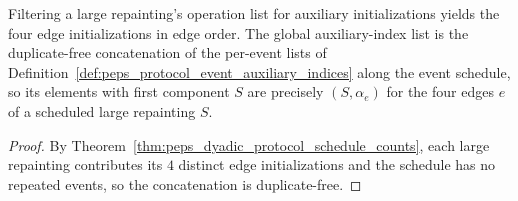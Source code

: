 \begin{lemma}
    \label{thm:peps_protocol_auxiliary_index_facts}
    \leanok
    Filtering a large repainting's operation list for auxiliary initializations yields the four edge initializations in edge order. The global auxiliary-index list is the duplicate-free concatenation of the per-event lists of Definition~\ref{def:peps_protocol_event_auxiliary_indices} along the event schedule, so its elements with first component $S$ are precisely $(S,\alpha_e)$ for the four edges $e$ of a scheduled large repainting $S$.
\end{lemma}

\begin{proof}\leanok
    By Theorem~\ref{thm:peps_dyadic_protocol_schedule_counts}, each large repainting contributes its $4$ distinct edge initializations and the schedule has no repeated events, so the concatenation is duplicate-free.
\end{proof}

